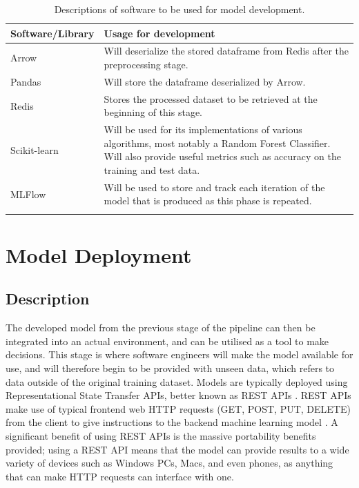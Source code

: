 \documentclass[12pt]{report}
\begin{document}
\begin{longtable}{ |p{}| p{}|}
    \hline
    \cellcolor{blue!25}Software/Library & \cellcolor{blue!25}Usage for development\\
    \hline
    Arrow & 
    Will deserialize the stored dataframe from Redis after the preprocessing stage.\\
    \hline
    Pandas & 
    Will store the dataframe deserialized by Arrow.\\
    \hline
    Redis &
    Stores the processed dataset to be retrieved at the beginning of this stage.\\
    \hline
    Scikit-learn & 
    Will be used for its implementations of various algorithms, most notably a Random Forest Classifier.
    Will also provide useful metrics such as accuracy on the training and test data.\\
    \hline
    MLFlow &
    Will be used to store and track each iteration of the model that is produced as this phase is 
    repeated.\\
    \hline
\caption{Descriptions of software to be used for model development.}\label{tab:DevelopmentSoftware}
\end{longtable}



\section{Model Deployment}\label{sec:Deployment}
\subsection{Description}
The developed model from the previous stage of the pipeline can then be integrated into an actual environment,
and can be utilised as a tool to make decisions. This stage is where software engineers will make the model 
available for use, and will therefore begin to be provided with unseen data, which refers to data outside of
the original training dataset. Models are typically deployed using Representational State Transfer APIs, 
better known as REST APIs \autocite{redhat_what_nodate}. REST APIs make use of typical frontend web 
HTTP requests (GET, POST, PUT, DELETE) from the client to give instructions to the backend machine learning
model \autocite{restfulapi_what_2023}. A significant benefit of using REST APIs is the 
massive portability benefits provided; using a REST API means that the model can provide results to a 
wide variety of devices such as Windows PCs, Macs, and even phones, as anything that can make HTTP requests 
can interface with one.
\end{document}
